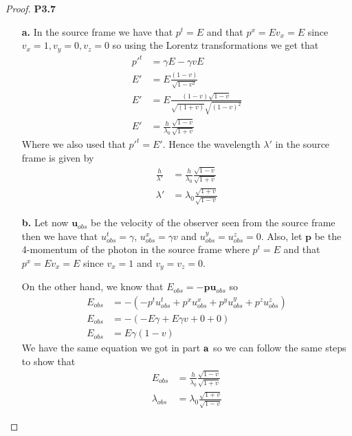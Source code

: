 \documentclass[11pt]{article}
\theoremstyle{definition}
\begin{document}
\cleardoublepage
\begin{proof}{\textbf{P3.7}}
    \begin{itemize}
    \item [\bf{a.}] In the source frame we have that $p^t = E$ and that
    $p^x = Ev_x = E$ since $v_x = 1, v_y = 0, v_z = 0$ so using the Lorentz transformations
    we get that
    \begin{align*}
        p'^t &= \gamma E - \gamma vE\\
        E' &= E\frac{(1  - v)}{\sqrt{1 - v^2}}\\
        E' &= E\frac{(1  - v)\sqrt{1 - v}}{\sqrt{(1 + v)}\sqrt{(1 - v)^2}}\\
        E' &= \frac{h}{\lambda_0}\frac{\sqrt{1 - v}}{\sqrt{1 + v}}
    \end{align*}
    Where we also used that $p'^t = E'$.
    Hence the wavelength $\lambda'$ in the source frame is given by
    \begin{align*}
        \frac{h}{\lambda'} &= \frac{h}{\lambda_0}\frac{\sqrt{1 - v}}{\sqrt{1 + v}}\\
        \lambda' &= \lambda_0\frac{\sqrt{1 + v}}{\sqrt{1 - v}}
    \end{align*}

    \item [\bf{b.}] Let now $\bm{u}_{obs}$ be the velocity of the observer
    seen from the source frame then we have that $u_{obs}^t = \gamma$,
    $u_{obs}^x = \gamma v$ and $u_{obs}^y = u_{obs}^z = 0$.
    Also, let $\bm{p}$ be the 4-momentum of the photon in the source frame
    where $p^t = E$ and that $p^x = Ev_x = E$
    since $v_x = 1$ and $v_y = v_z = 0$.

    On the other hand, we know that $E_{obs} = -\bm{p}\bm{u}_{obs}$ so
    \begin{align*}
        E_{obs} &= - (-p^t u_{obs}^t
        + p^x u_{obs}^x + p^y u_{obs}^y + p^z u_{obs}^z)\\
        E_{obs} &= -(-E\gamma + E\gamma v + 0 + 0)\\
        E_{obs} &= E\gamma(1 - v)
    \end{align*}
    We have the same equation we got in part $\bf{a}$ so we can follow the same
    steps to show that
    \begin{align*}
        E_{obs} &= \frac{h}{\lambda_0}\frac{\sqrt{1 - v}}{\sqrt{1 + v}}\\
        \lambda_{obs} &= \lambda_0\frac{\sqrt{1 + v}}{\sqrt{1 - v}}
    \end{align*}
    \end{itemize}
\end{proof}
\end{document}
